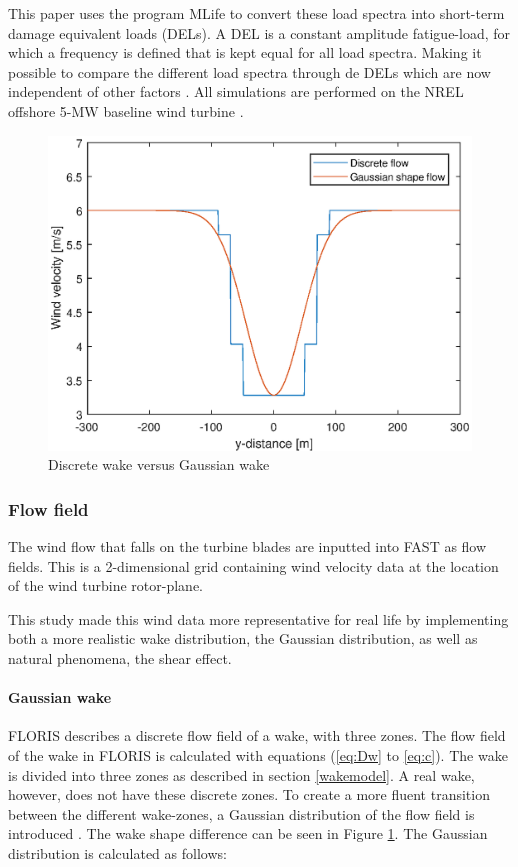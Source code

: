 This paper uses the program MLife to convert these load spectra into short-term damage equivalent loads (DELs). A DEL is a constant amplitude fatigue-load, for which a frequency is defined that is kept equal for all load spectra. Making it possible to compare the different load spectra through de DELs which are now independent of other factors \cite{MLife,Wilson2017}. All simulations are performed on the NREL offshore 5-MW baseline wind turbine \cite{Jonkman2005}.


\begin{figure}
  \includegraphics[width=\linewidth]{./Figures/PlotGausDiscWakeDWake180U6yaw0.eps} %
  \caption{Discrete wake versus Gaussian wake} %
  \label{fig:disgaus}
\end{figure}


\subsubsection{Flow field} \label{sec:flowfield}
The wind flow that falls on the turbine blades are inputted into FAST as flow fields. This is a 2-dimensional grid containing wind velocity data at the location of the wind turbine rotor-plane.

This study made this wind data more representative for real life by implementing both a more realistic wake distribution, the Gaussian distribution, as well as natural phenomena, the shear effect.

\paragraph{Gaussian wake}
FLORIS describes a discrete flow field of a wake, with three zones. The flow field of the wake in FLORIS is calculated with equations (\ref{eq:Dw} to \ref{eq:c}). The wake is divided into three zones as described in section \ref{wakemodel}. A real wake, however, does not have these discrete zones. To create a more fluent transition between the different wake-zones, a Gaussian distribution of the flow field is introduced \cite{Bastankhah2016}. The wake shape difference can be seen in Figure \ref{fig:disgaus}.  The Gaussian distribution is calculated as follows: 

